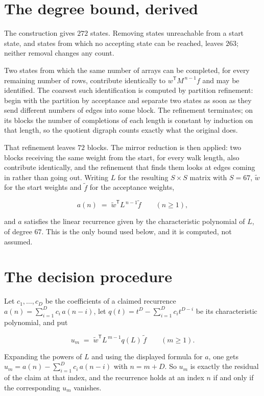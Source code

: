 \documentclass[11pt]{article}
\theoremstyle{definition}
\begin{document}
\section{The degree bound, derived}

The construction gives $272$ states. Removing states unreachable from a start state, and states from which no accepting state can be reached, leaves $263$; neither removal changes any count.

Two states from which the same number of arrays can be completed, for every remaining number of rows, contribute identically to $w^{\mathsf T}M^{\,n-1}f$ and may be identified. The coarsest such identification is computed by partition refinement: begin with the partition by acceptance and separate two states as soon as they send different numbers of edges into some block. The refinement terminates; on its blocks the number of completions of each length is constant by induction on that length, so the quotient digraph counts exactly what the original does.

That refinement leaves $72$ blocks. The mirror reduction is then applied: two blocks receiving the same weight from the start, for every walk length, also contribute identically, and the refinement that finds them looks at edges coming in rather than going out. Writing $L$ for the resulting $S \times S$ matrix with $S = 67$, $\tilde w$ for the start weights and $\tilde f$ for the acceptance weights,

\[a(n) \;=\; \tilde w^{\mathsf T} L^{\,n-1} \tilde f \qquad (n \ge 1),\]

and $a$ satisfies the linear recurrence given by the characteristic polynomial of $L$, of degree $67$. This is the only bound used below, and it is computed, not assumed.

\section{The decision procedure}

Let $c_1,\dots,c_D$ be the coefficients of a claimed recurrence $a(n) = \sum_{i=1}^{D} c_i\,a(n-i)$, let $q(t) = t^{D} - \sum_{i=1}^{D} c_i t^{D-i}$ be its characteristic polynomial, and put

\[u_m \;=\; \tilde w^{\mathsf T} L^{\,m-1} q(L)\,\tilde f \qquad (m \ge 1).\]

Expanding the powers of $L$ and using the displayed formula for $a$, one gets $u_m = a(n) - \sum_{i=1}^{D} c_i\,a(n-i)$ with $n = m + D$. So $u_m$ is exactly the residual of the claim at that index, and the recurrence holds at an index $n$ if and only if the corresponding $u_m$ vanishes.
\end{document}
